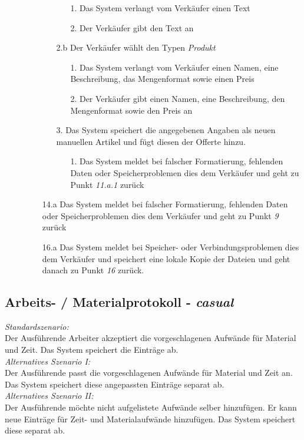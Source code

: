 \documentclass[a4paper,12pt]{article}
\begin{document}
\begin{description}
\begin{enumerate}
\begin{enumerate}
				\begin{enumerate}
					\item[1.] Das System verlangt vom Verkäufer einen Text
					\item[2.] Der Verkäufer gibt den Text an
				\end{enumerate}
				\item[2.b] Der Verkäufer wählt den Typen \emph{Produkt}
				\begin{enumerate}
					\item[1.] Das System verlangt vom Verkäufer einen Namen, eine Beschreibung,
					das Mengenformat sowie einen Preis
					\item[2.] Der Verkäufer gibt einen Namen, eine Beschreibung, den Mengenformat
					sowie den Preis an
				\end{enumerate} 
				\item[3.] Das System speichert die angegebenen Angaben als neuen manuellen Artikel
				und fügt diesen der Offerte hinzu.
				\begin{enumerate}
					\item [1.] Das System meldet bei falscher Formatierung, fehlenden Daten
					oder Speicherproblemen dies dem Verkäufer und geht zu Punkt \emph{11.a.1} zurück
				\end{enumerate} 
			\end{enumerate}
			\item [14.a] Das System meldet bei falscher Formatierung, fehlenden Daten
			oder Speicherproblemen dies dem Verkäufer und geht zu Punkt \emph{9} zurück
			\item [16.a] Das System meldet bei Speicher-  oder Verbindungsproblemen
			dies dem Verkäufer und speichert eine lokale Kopie der Dateien und geht danach
			zu Punkt \emph{16} zurück.
		\end{enumerate}
	\end{description}
	
	\newpage
	\subsection{Arbeits- / Materialprotokoll  - \emph{casual}}
		\emph{Standardszenario:} \\
		Der Ausführende Arbeiter akzeptiert die vorgeschlagenen Aufwände für Material
		und Zeit. Das System speichert die Einträge ab.\\
		\emph{Alternatives Szenario I:}\\
		Der Ausführende passt die vorgeschlagenen Aufwände für Material und Zeit an.
		Das System speichert diese angepassten Einträge separat ab.\\	
		\emph{Alternatives Szenario II:}\\
		Der Ausführende möchte nicht aufgelistete Aufwände selber hinzufügen. Er kann neue
		Einträge für Zeit- und Materialaufwände hinzufügen. Das System speichert diese separat ab.
	\newpage
\end{document}
